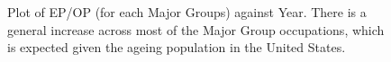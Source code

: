 \documentclass[11pt]{article}
\begin{document}
\begin{figure}[!htb]
	\centering
	\hfill
	\hfill
	\caption{Plot of EP/OP (for each Major Groups) against Year. There is a general increase across most of the Major Group occupations, which is expected given the ageing population in the United States.}
	\label{fig:EP/OP against year}
\end{figure}
\end{document}
